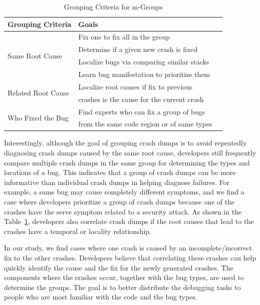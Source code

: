 \documentclass{llncs}
\begin{document}
\begin{table}[!htb]
\centering
\caption{Grouping Criteria for m-Groups\label{tab:goal}}
\begin{tabular}{|l||l|l|}\hline
Grouping Criteria&Goals\\\hline\hline
\multirow{4}{*}{Same Root Cause}&Fix one to fix all in the group\\\cline{2-2}
&Determine if a given new crash is fixed\\\cline{2-2}
&Localize bugs via comparing similar stacks\\\cline{2-2}
&Learn bug manifestation to prioritize them\\\hline\hline
\multirow{2}{*}{Related Root Cause}&Localize root causes if fix to previous\\
&crashes is the cause for the current crash\\\hline\hline
\multirow{2}{*}{Who Fixed the Bug}&Find experts who can fix a group of bugs\\
&from the same code region or of same types\\\hline
\end{tabular}
\end{table}


Interestingly, although the goal of grouping crash dumps is to avoid repeatedly diagnosing crash dumps caused by the same root cause, developers still frequently compare multiple crash dumps in the same group for determining the types and locations of a bug. This indicates that a group of crash dumps can be more informative than individual crash dumps in helping diagnose failures. For example, a same bug may cause completely different symptoms, and we find a case where developers prioritize a group of crash dumps because one of the crashes have the serve symptom related to a security attack. As shown in the Table~\ref{tab:goal}, developers also correlate crash dumps if the root causes that lead to the crashes have a temporal or locality relationship.

In our study, we find cases where one crash is caused by an incomplete/incorrect fix to the other crashes. Developers believe that correlating these crashes can help quickly identify the cause and the fix for the newly generated crashes. The components where the crashes occur, together with the bug types, are used to determine the groups. The goal is to better distribute the debugging tasks to people who are most familiar with the code and the bug types.
\end{document}
